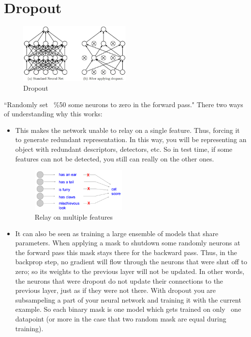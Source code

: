 \chapter{Dropout}
\begin{figure}[!htb]
  \centering
  \includegraphics[width=0.5\textwidth]{Images/dropout/1.jpeg}
  \caption{Dropout}
\end{figure}
``Randomly set ~\%50 some neurons to zero in the forward pass."  There two ways of understanding why this works:
\begin{itemize}
\item This makes the network unable to relay on a single feature. Thus, forcing it to generate redundant representation. In this way, you will be representing an object with redundant descriptors, detectors, etc. So in test time, if some features can not be detected, you still can really on the other ones.

\begin{figure}[!htb]
  \centering
  \includegraphics[width=0.45\textwidth]{Images/dropout/3.png}
  \caption{Relay on multiple features}
\end{figure}

\item It can also be seen as training a large ensemble of models that share parameters. When applying a mask to shutdown some randomly neurons at the forward pass this mask stays there for the backward pass. Thus, in the backprop step, no gradient will flow through the neurons that were shut off to zero; so its weights to the previous layer will not be updated. In other words, the neurons that were dropout do not update their connections to the previous layer, just as if they were not there. With dropout you are subsampeling a part of your neural network and training it with the current example. So each binary mask is one model which gets trained on only ~one datapoint (or more in the case that two random mask are equal during training).
\end{itemize}

